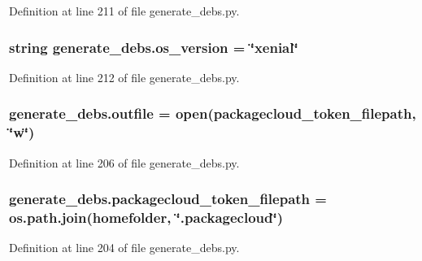 Definition at line 211 of file generate\+\_\+debs.\+py.

\subsubsection[{\texorpdfstring{os\+\_\+version}{os_version}}]{\setlength{\rightskip}{0pt plus 5cm}string generate\+\_\+debs.\+os\+\_\+version = \char`\"{}xenial\char`\"{}}\hypertarget{namespacegenerate__debs_afb8badf2c49de1c3be06aefc87f38932}{}\label{namespacegenerate__debs_afb8badf2c49de1c3be06aefc87f38932}


Definition at line 212 of file generate\+\_\+debs.\+py.

\subsubsection[{\texorpdfstring{outfile}{outfile}}]{\setlength{\rightskip}{0pt plus 5cm}generate\+\_\+debs.\+outfile = open({\bf packagecloud\+\_\+token\+\_\+filepath}, \char`\"{}w\char`\"{})}\hypertarget{namespacegenerate__debs_aa1faa039b35b72ee44dc6f106ad12911}{}\label{namespacegenerate__debs_aa1faa039b35b72ee44dc6f106ad12911}


Definition at line 206 of file generate\+\_\+debs.\+py.

\subsubsection[{\texorpdfstring{packagecloud\+\_\+token\+\_\+filepath}{packagecloud_token_filepath}}]{\setlength{\rightskip}{0pt plus 5cm}generate\+\_\+debs.\+packagecloud\+\_\+token\+\_\+filepath = os.\+path.\+join({\bf homefolder}, \char`\"{}.packagecloud\char`\"{})}\hypertarget{namespacegenerate__debs_a836a20b989c3c8e46255d91d10cb524f}{}\label{namespacegenerate__debs_a836a20b989c3c8e46255d91d10cb524f}


Definition at line 204 of file generate\+\_\+debs.\+py.

